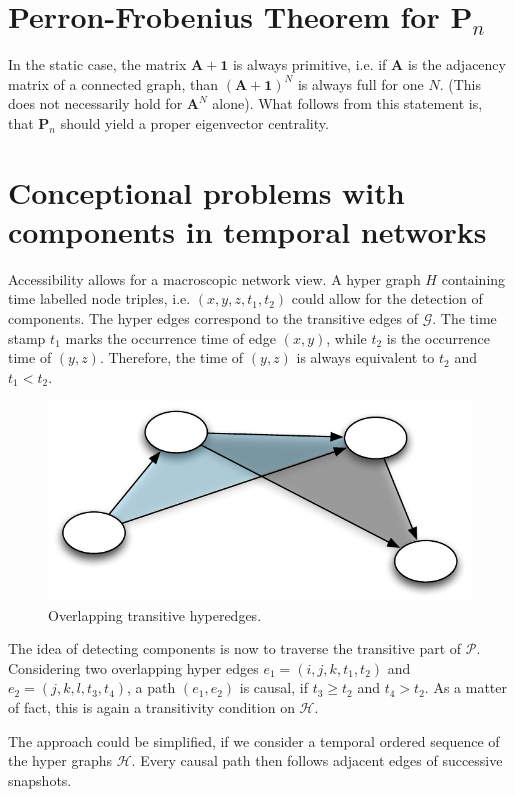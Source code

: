 \section{Perron-Frobenius Theorem for $\mathbf{P}_n$}
In the static case, the matrix $\mathbf{A}+\mathbf{1}$ is always primitive, i.e. if $\mathbf{A}$ is the adjacency matrix of a connected graph, than $(\mathbf{A}+\mathbf{1})^N$ is always full for one $N$.
(This does not necessarily hold for $\mathbf{A}^N$ alone).
What follows from this statement is, that $\mathbf{P}_n$ should yield a proper eigenvector centrality.

\section{Conceptional problems with components in temporal networks}
Accessibility allows for a macroscopic network view.
A hyper graph $H$ containing time labelled node triples, i.e. $(x,y,z,t_1,t_2)$ could allow for the detection of components.
The hyper edges correspond to the transitive edges of $\mathcal{G}$.
The time stamp $t_1$ marks the occurrence time of edge $(x,y)$, while $t_2$ is the occurrence time of $(y,z)$.
Therefore, the time of $(y,z)$ is always equivalent to $t_2$ and $t_1<t_2$.
%
\begin{figure}[htbp]
\begin{center}
\includegraphics{images/transitivity_scheme}
\caption{Overlapping transitive hyperedges.}
\label{fig:overlapping_hyperedges}
\end{center}
\end{figure}

The idea of detecting components is now to traverse the transitive part of $\mathcal{P}$.
Considering two overlapping hyper edges $e_1=(i,j,k,t_1,t_2)$ and $e_2=(j,k,l,t_3,t_4)$, a path $(e_1,e_2)$ is causal, if $t_3\geq t_2$ and $t_4>t_2$.
As a matter of fact, this is again a transitivity condition on $\mathcal{H}$.

The approach could be simplified, if we consider a temporal ordered sequence of the hyper graphs $\mathcal{H}$.
Every causal path then follows adjacent edges of successive snapshots.


